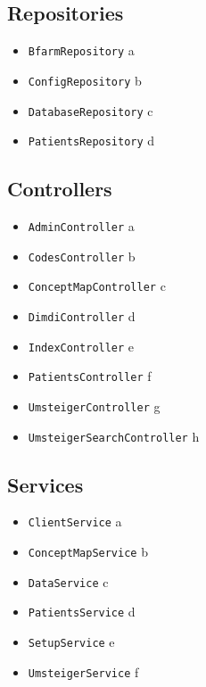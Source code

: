 \subsection{Repositories}

\begin{itemize}
\item \texttt{BfarmRepository} \newline a
\item \texttt{ConfigRepository} \newline b
\item \texttt{DatabaseRepository} \newline c
\item \texttt{PatientsRepository} \newline d
\end{itemize}

\subsection{Controllers}

\begin{itemize}
\item \texttt{AdminController} \newline a
\item \texttt{CodesController} \newline b
\item \texttt{ConceptMapController} \newline c
\item \texttt{DimdiController} \newline d
\item \texttt{IndexController} \newline e
\item \texttt{PatientsController} \newline f
\item \texttt{UmsteigerController} \newline g
\item \texttt{UmsteigerSearchController} \newline h
\end{itemize}

\subsection{Services}

\begin{itemize}
\item \texttt{ClientService} \newline a
\item \texttt{ConceptMapService} \newline b
\item \texttt{DataService} \newline c
\item \texttt{PatientsService} \newline d
\item \texttt{SetupService} \newline e
\item \texttt{UmsteigerService} \newline f
\end{itemize}

